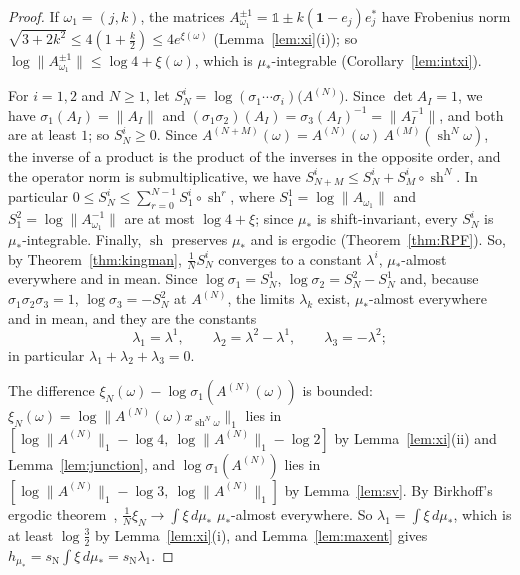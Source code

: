\documentclass[11pt]{amsart}
\newcommand{\id}{\mathds{1}}
\theoremstyle{definition}
\theoremstyle{remark}
\newcommand{\one}{\mathbf 1}
\newcommand{\sN}{s_{\mathrm N}}
\newcommand{\norm}[1]{\lVert #1\rVert}
\begin{document}
\begin{proof}
    If $\omega_1=(j,k)$, the matrices $A_{\omega_1}^{\pm1}=\id\pm k(\one-e_j)e_j^*$ have Frobenius norm $\sqrt{3+2k^2}\le4(1+\frac k2)\le4e^{\xi(\omega)}$ (Lemma~\ref{lem:xi}(i)); so $\log\norm{A_{\omega_1}^{\pm1}}\le\log4+\xi(\omega)$, which is $\mu_*$-integrable (Corollary~\ref{lem:intxi}). 

    For $i=1,2$ and $N\ge1$, let $S^i_N=\log(\sigma_1\cdots\sigma_i)\bigl(A^{(N)}\bigr)$. Since $\det A_I=1$, we have $\sigma_1(A_I)=\norm{A_I}$ and $(\sigma_1\sigma_2)(A_I)=\sigma_3(A_I)^{-1}=\norm{A_I^{-1}}$, and both are at least $1$; so $S^i_N\ge0$. Since $A^{(N+M)}(\omega)=A^{(N)}(\omega)\,A^{(M)}(\operatorname{sh}^N\omega)$, the inverse of a product is the product of the inverses in the opposite order, and the operator norm is submultiplicative, we have $S^i_{N+M}\le S^i_N+S^i_M\circ\operatorname{sh}^N$. In particular $0\le S^i_N\le\sum_{r=0}^{N-1}S^i_1\circ\operatorname{sh}^r$, where $S^1_1=\log\norm{A_{\omega_1}}$ and $S^2_1=\log\norm{A_{\omega_1}^{-1}}$ are at most $\log4+\xi$; since $\mu_*$ is shift-invariant, every $S^i_N$ is $\mu_*$-integrable. Finally, $\operatorname{sh}$ preserves $\mu_*$ and is ergodic (Theorem~\ref{thm:RPF}).
    So, by Theorem~\ref{thm:kingman}, $\frac1NS^i_N$ converges to a constant $\lambda^i$, $\mu_*$-almost everywhere and in mean. Since $\log\sigma_1=S^1_N$, $\log\sigma_2=S^2_N-S^1_N$ and, because $\sigma_1\sigma_2\sigma_3=1$, $\log\sigma_3=-S^2_N$ at $A^{(N)}$, the limits $\lambda_k$ exist, $\mu_*$-almost everywhere and in mean, and they are the constants
\[
  \lambda_1=\lambda^1,\qquad\lambda_2=\lambda^2-\lambda^1,\qquad\lambda_3=-\lambda^2;
\]
    in particular $\lambda_1+\lambda_2+\lambda_3=0$.

    The difference $\xi_N(\omega)-\log\sigma_1(A^{(N)}(\omega))$ is bounded: $\xi_N(\omega)=\log\norm{A^{(N)}(\omega)x_{\operatorname{sh}^N\omega}}_1$ lies in $[\log\norm{A^{(N)}}_1-\log4,\ \log\norm{A^{(N)}}_1-\log2]$ by Lemma~\ref{lem:xi}(ii) and Lemma~\ref{lem:junction}, and $\log\sigma_1(A^{(N)})$ lies in $[\log\norm{A^{(N)}}_1-\log3,\ \log\norm{A^{(N)}}_1]$ by Lemma~\ref{lem:sv}. 
    By Birkhoff's ergodic theorem~\cite{Bir31}, $\frac1N\xi_N\to\int\xi\,d\mu_*$ $\mu_*$-almost everywhere. So $\lambda_1=\int\xi\,d\mu_*$, which is at least $\log\frac32$ by Lemma~\ref{lem:xi}(i), and Lemma~\ref{lem:maxent} gives $h_{\mu_*}=\sN\int\xi\,d\mu_*=\sN\lambda_1$.


\end{proof}
\end{document}
